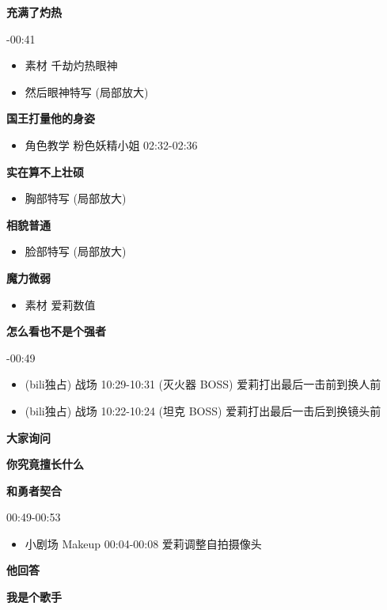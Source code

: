 \documentclass[a4paper]{article}
\begin{document}
\textbf{充满了灼热}

-00:41
 
\begin{itemize}
    \item 素材 千劫灼热眼神
    \item 然后眼神特写 (局部放大)
\end{itemize}

\textbf{国王打量他的身姿}

\begin{itemize}
    \item 角色教学 粉色妖精小姐 02:32-02:36
\end{itemize}

\textbf{实在算不上壮硕}

\begin{itemize}
    \item 胸部特写 (局部放大)
\end{itemize}

\textbf{相貌普通}

\begin{itemize}
    \item 脸部特写 (局部放大)
\end{itemize}

\textbf{魔力微弱}

\begin{itemize}
    \item 素材 爱莉数值
\end{itemize}

\textbf{怎么看也不是个强者}

-00:49

\begin{itemize}
    \item (bili独占) 战场 10:29-10:31 (灭火器 BOSS) 爱莉打出最后一击前到换人前
    \item (bili独占) 战场 10:22-10:24 (坦克 BOSS) 爱莉打出最后一击后到换镜头前
\end{itemize}

\textbf{大家询问}

\textbf{你究竟擅长什么}

\textbf{和勇者契合}

00:49-00:53

\begin{itemize}
    \item 小剧场 Makeup 00:04-00:08 爱莉调整自拍摄像头
\end{itemize}

\textbf{他回答}

\textbf{我是个歌手}
\end{document}
